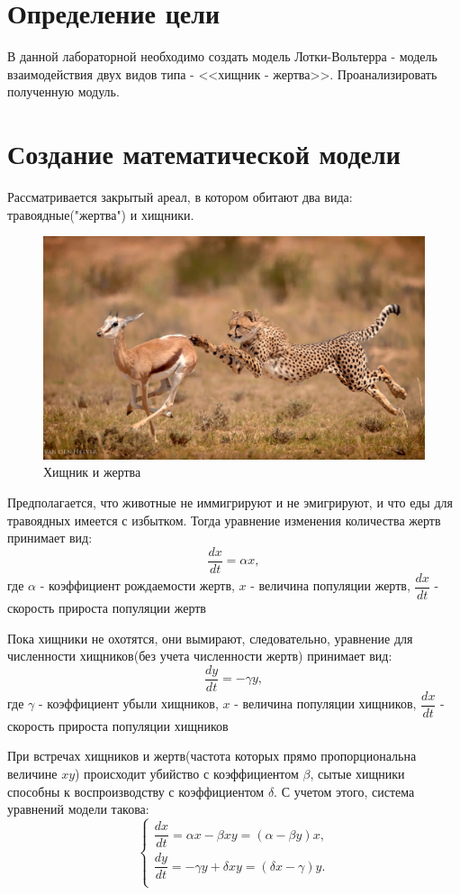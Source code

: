 \documentclass[a4paper, 14pt]{extarticle}
\begin{document}
	\pagebreak	

	\section{Определение цели}
		В данной лабораторной необходимо создать модель Лотки-Вольтерра - модель взаимодействия двух видов типа - <<хищник - жертва>>.
		Проанализировать полученную модуль.

	\section{Создание математической модели}
		Рассматривается закрытый ареал, в котором обитают два вида: травоядные("жертва") и хищники. 
		\begin{figure}[H]
			\centering
			\includegraphics[width = \linewidth] {1.jpg}
			\caption[.] {Хищник и жертва}
		\end{figure}
		Предполагается, что животные не иммигрируют и не эмигрируют, и
		что еды для травоядных имеется с избытком. Тогда уравнение изменения количества жертв принимает вид:
			\[ \dfrac{dx}{dt} = \alpha x,\]
		где $\alpha$ - коэффициент рождаемости жертв, $x$ - величина популяции жертв, $\dfrac{dx}{dt}$ - скорость прироста популяции жертв

		Пока хищники не охотятся, они вымирают, следовательно, уравнение для численности хищников(без учета численности жертв) принимает вид:
			\[ \dfrac{dy}{dt} = -\gamma y,\]
		где $\gamma$ - коэффициент убыли хищников, $x$ - величина популяции хищников, $\dfrac{dx}{dt}$ - скорость прироста популяции хищников

		При встречах хищников и жертв(частота которых прямо пропорциональна величине $xy$) происходит убийство с коэффициентом $\beta$, сытые хищники способны к воспроизводству с коэффициентом $\delta$.
		С учетом этого, система уравнений модели такова:
		\[ \begin{cases}
			\dfrac{dx}{dt} = \alpha x - \beta xy = (\alpha - \beta y)x, \\
			\dfrac{dy}{dt} = - \gamma y + \delta xy = (\delta x - \gamma)y. \\
		    \end{cases}
		 \]
		 
\end{document}
